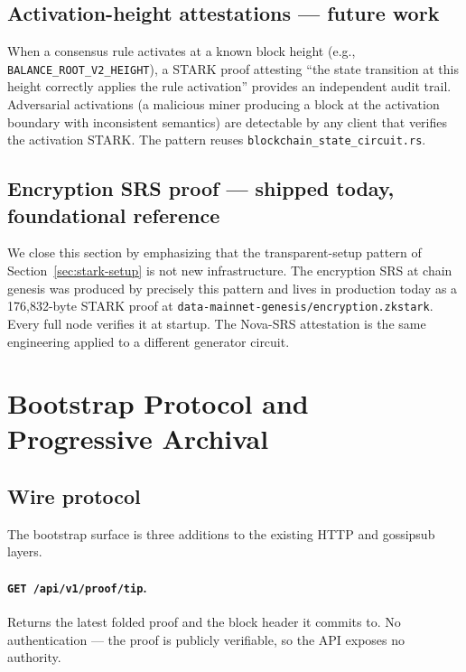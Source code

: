 \documentclass[11pt,a4paper]{article}
\begin{document}
\subsection{Activation-height attestations --- future work}

When a consensus rule activates at a known block height (e.g.,
\texttt{BALANCE\_ROOT\_V2\_HEIGHT}), a STARK proof attesting ``the
state transition at this height correctly applies the rule activation''
provides an independent audit trail. Adversarial activations (a
malicious miner producing a block at the activation boundary with
inconsistent semantics) are detectable by any client that verifies
the activation STARK. The pattern reuses
\texttt{blockchain\_state\_circuit.rs}.

\subsection{Encryption SRS proof --- shipped today, foundational reference}

We close this section by emphasizing that the transparent-setup pattern
of Section~\ref{sec:stark-setup} is not new infrastructure. The
encryption SRS at chain genesis was produced by precisely this pattern
and lives in production today as a 176{,}832-byte STARK proof at
\texttt{data-mainnet-genesis/encryption.zkstark}. Every full node
verifies it at startup. The Nova-SRS attestation is the same engineering
applied to a different generator circuit.

\section{Bootstrap Protocol and Progressive Archival}
\label{sec:bootstrap}

\subsection{Wire protocol}

The bootstrap surface is three additions to the existing HTTP and
gossipsub layers.

\paragraph{\texttt{GET /api/v1/proof/tip}.}
Returns the latest folded proof and the block header it commits to.
No authentication --- the proof is publicly verifiable, so the API
exposes no authority.
\end{document}
